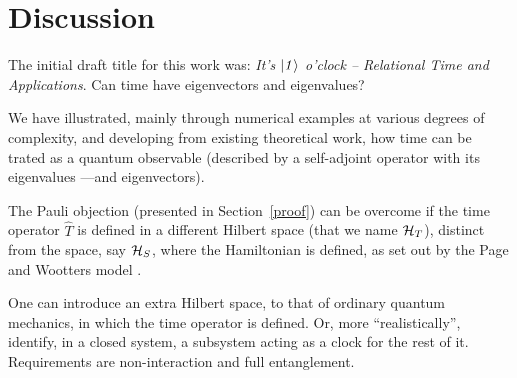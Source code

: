 \section{Discussion}

The initial draft title for this work was: 
\textit{It's $\it\ket{1}$ o'clock -- Relational Time and Applications}.
Can time have eigenvectors and eigenvalues?

We have illustrated,
mainly through numerical examples
at various degrees of complexity,
and developing from existing theoretical work,
how time can be trated as a quantum observable
(described by a self-adjoint operator with its eigenvalues ---and eigenvectors).

The Pauli objection (presented in Section~\ref{proof})
can be overcome if the time operator $\hat{T}$
is defined in a different Hilbert space (that we name $\mathcal{H}_T$),
distinct from
the space, say $\mathcal{H}_S$, where the Hamiltonian is defined,
as set out by the Page and Wootters model
\parencite{PageWootters, Lloyd:Time, Marletto:Evolution, Maccone:QMOT, Maccone:Pauli}.

One can introduce an extra Hilbert space, to that of ordinary quantum mechanics,
in which the time operator is defined.
Or, more ``realistically'', identify, in a closed system, a subsystem
acting as a clock for the rest of it. Requirements are non-interaction and
full entanglement.

